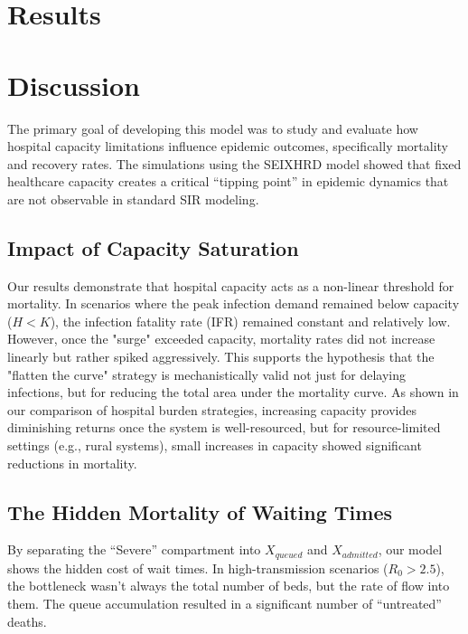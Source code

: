 \documentclass[10pt,twocolumn]{article}
\begin{document}
\section{Results}

\section{Discussion}

The primary goal of developing this model was to study and evaluate how hospital capacity limitations influence epidemic outcomes, specifically mortality and recovery rates. The simulations using the SEIXHRD model showed that fixed healthcare capacity creates a critical “tipping point” in epidemic dynamics that are not observable in standard SIR modeling.

\subsection{Impact of Capacity Saturation}

Our results demonstrate that hospital capacity acts as a non-linear threshold for mortality. 
In scenarios where the peak infection demand remained below capacity ($H < K$), the infection fatality rate (IFR) remained constant and relatively low. 
However, once the "surge" exceeded capacity, mortality rates did not increase linearly but rather spiked aggressively. 
This supports the hypothesis that the "flatten the curve" strategy is mechanistically valid not just for delaying infections, but for reducing the total area under the mortality curve. 
As shown in our comparison of hospital burden strategies, increasing capacity provides diminishing returns once the system is well-resourced, but for resource-limited settings (e.g., rural systems), small increases in capacity showed significant reductions in mortality.

\subsection{The Hidden Mortality of Waiting Times}

By separating the “Severe” compartment into $X_{queued}$ and $X_{admitted}$, our model shows the hidden cost of wait times.
In high-transmission scenarios ($R_0 > 2.5$), the bottleneck wasn't always the total number of beds, but the rate of flow into them.
The queue accumulation resulted in a significant number of “untreated” deaths.
\end{document}

